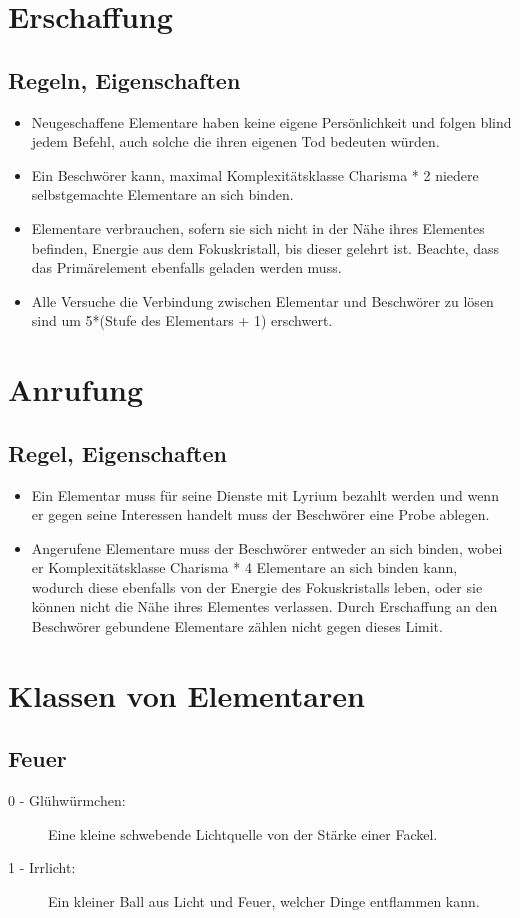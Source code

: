 \documentclass[a4paper,12pt,oneside]{book}
\begin{document}
\section{Erschaffung}
\subsection{Regeln, Eigenschaften}
\begin{itemize}
\item Neugeschaffene Elementare haben keine eigene Persönlichkeit und folgen blind jedem Befehl, auch solche die ihren eigenen Tod bedeuten würden.
\item Ein Beschwörer kann, maximal Komplexitätsklasse Charisma * 2 niedere selbstgemachte Elementare an sich binden.
\item Elementare verbrauchen, sofern sie sich nicht in der Nähe ihres Elementes befinden, Energie aus dem Fokuskristall, bis dieser gelehrt ist. Beachte, dass das Primärelement ebenfalls geladen werden muss.
\item Alle Versuche die Verbindung zwischen Elementar und Beschwörer zu lösen sind um 5*(Stufe des Elementars + 1) erschwert. 
\end{itemize}
\section{Anrufung}
\subsection{Regel, Eigenschaften}
\begin{itemize}
\item Ein Elementar muss für seine Dienste mit Lyrium bezahlt werden und wenn er gegen seine Interessen handelt muss der Beschwörer eine Probe ablegen.
\item Angerufene Elementare muss der Beschwörer entweder an sich binden, wobei er Komplexitätsklasse Charisma * 4 Elementare an sich binden kann, wodurch diese ebenfalls von der Energie des Fokuskristalls leben, oder sie können nicht die Nähe ihres Elementes verlassen. Durch Erschaffung an den Beschwörer gebundene Elementare zählen nicht gegen dieses Limit. 
\end{itemize}
\section{Klassen von Elementaren}
\subsection{Feuer}
\begin{description}
\item[0 - Glühwürmchen:]Eine kleine schwebende Lichtquelle von der Stärke einer Fackel.
\item[1 - Irrlicht:]Ein kleiner Ball aus Licht und Feuer, welcher Dinge entflammen kann.
\end{description}
\end{document}
